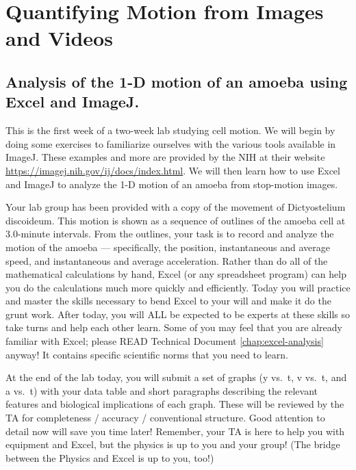 \chapter{Quantifying Motion from Images and Videos}
\thispagestyle{fancy}
%
\section{Analysis of the 1-D motion of an amoeba using Excel and ImageJ.}
This is the first week of a two-week lab studying cell motion.
We will begin by doing some exercises to familiarize ourselves with the various tools available in ImageJ.
These examples and more are provided by the NIH at their website \url{https://imagej.nih.gov/ij/docs/index.html}.
We will then learn how to use Excel and ImageJ to analyze the 1-D motion of an amoeba from stop-motion images.
\par
Your lab group has been provided with a copy of the movement of Dictyostelium discoideum.
This motion is shown as a sequence of outlines of the amoeba cell at 3.0-minute intervals.
From the outlines, your task is to record and analyze the motion of the amoeba — specifically, the position, instantaneous and average speed, and instantaneous and average acceleration.
Rather than do all of the mathematical calculations by hand, Excel (or any spreadsheet program) can help you do the calculations much more quickly and efficiently.
Today you will practice and master the skills necessary to bend Excel to your will and make it do the grunt work.
After today, you will ALL be expected to be experts at these skills so take turns and help each other learn.
Some of you may feel that you are already familiar with Excel; please READ Technical Document \ref{chap:excel-analysis} anyway!
It contains specific scientific norms that you need to learn.
\par
At the end of the lab today, you will submit a set of graphs (y vs.\ t, v vs.\ t, and a vs.\ t) with your data table and short paragraphs describing the relevant features and biological implications of each graph.
These will be reviewed by the TA for completeness / accuracy / conventional structure.
Good attention to detail now will save you time later!
Remember, your TA is here to help you with equipment and Excel, but the physics is up to you and your group!
(The bridge between the Physics and Excel is up to you, too!)
